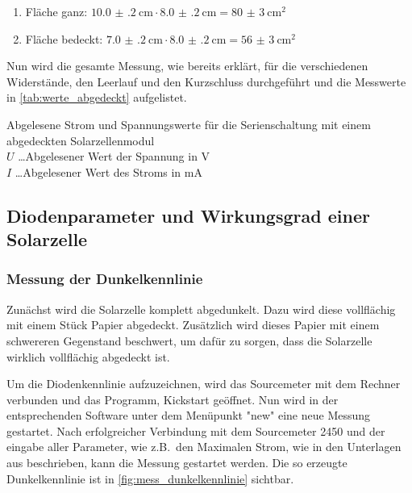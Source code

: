 \documentclass[12pt,english,ngerman]{scrartcl}
\begin{document}
\begin{enumerate}
	\item Fläche ganz: $\SI{10.0(2)}{\cm}\cdot \SI{8.0(2)}{\cm}=\SI{80(3)}{\cm\squared}$
	\item Fläche bedeckt: $\SI{7.0(2)}{\cm}\cdot
		      \SI{8.0(2)}{\cm}=\SI{56(3)}{\cm\squared}$\label{list:flaechenSolar1}
\end{enumerate}

Nun wird die gesamte Messung, wie bereits erklärt, für die verschiedenen
Widerstände, den Leerlauf und den Kurzschluss durchgeführt und die Messwerte in
\autoref{tab:werte_abgedeckt} aufgelistet.

\begin{table}[H]
	\caption[Abgelesene Strom und Spannungswerte für die Serienschaltung mit einem abgedeckten Solarzellenmodul]
	{Abgelesene Strom und Spannungswerte für die Serienschaltung mit einem abgedeckten Solarzellenmodul\\
	$U$ \dots Abgelesener Wert der Spannung in V\\
	$I$ \dots Abgelesener Wert des Stroms in mA}\label{tab:werte_abgedeckt}
	\centering
	
\end{table}

\subsection{Diodenparameter und Wirkungsgrad einer Solarzelle}

\subsubsection{Messung der Dunkelkennlinie}

Zunächst wird die Solarzelle komplett abgedunkelt. Dazu wird diese vollflächig
mit einem Stück Papier abgedeckt. Zusätzlich wird dieses Papier mit einem
schwereren Gegenstand beschwert, um dafür zu sorgen, dass die Solarzelle
wirklich vollflächig abgedeckt ist.

Um die Diodenkennlinie aufzuzeichnen, wird das Sourcemeter mit dem Rechner
verbunden und das Programm, Kickstart geöffnet. Nun wird in der entsprechenden
Software unter dem Menüpunkt "new" eine neue Messung gestartet. Nach
erfolgreicher Verbindung mit dem Sourcemeter 2450 und der eingabe aller
Parameter, wie z.B.\ den Maximalen Strom, wie in den Unterlagen aus
\cite{unterlagen_solarzelle} beschrieben, kann die Messung gestartet werden.
Die so erzeugte Dunkelkennlinie ist in \autoref{fig:mess_dunkelkennlinie}
sichtbar.
\end{document}
